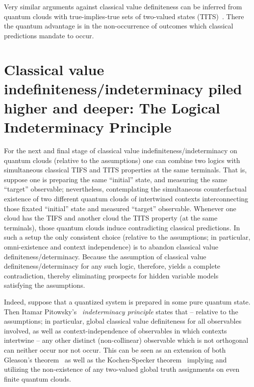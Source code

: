 \documentclass[%
  twocolumn,
 showpacs,
 showkeys,
 preprintnumbers,
 amsmath,amssymb,
 aps,
  pra,
  longbibliography,
 ]{revtex4-1}
\begin{document}
Very similar arguments against classical value definiteness can be inferred from quantum clouds with true-implies-true
sets of two-valued
states (TITS)~\citep{stairs83,clifton-93,Johansen-1994,Vermaas-1994,Belinfante-73,Pitowsky-1982-subs,Hardy-92,Hardy-93,hardy-97,Cabello-1995-ppks,cabello-96,cabello-97-nhvp,Badziag-2011,Cabello-2013-HP,Cabello-2013-Hardylike,2018-minimalYIYS}.
There the quantum advantage is in the non-occurrence of outcomes which classical predictions mandate to occur.


\section{Classical value indefiniteness/indeterminacy piled higher and deeper: The Logical Indeterminacy Principle}

For the next and final stage of classical value indefiniteness/indeterminacy on quantum clouds (relative to the assumptions)
one can combine two logics with simultaneous classical TIFS and TITS properties at the same terminals.
That is,
suppose one is preparing the same ``initial'' state, and measuring the same ``target'' observable;
nevertheless, contemplating
the simultaneous counterfactual existence of
two different quantum clouds of intertwined contexts
interconnecting those fixated ``initial'' state and measured ``target'' observable.
Whenever one cloud has the
TIFS and another cloud the TITS property (at the same terminals),
those quantum clouds induce contradicting classical predictions.
In such a setup the only consistent choice (relative to the assumptions; in particular, omni-existence and context independence)
is to abandon classical value definiteness/determinacy.
Because the assumption of classical value definiteness/determinacy for any such logic,
therefore, yields a complete contradiction,
thereby eliminating prospects for hidden
variable models~\citep{2012-incomput-proofsCJ,2015-AnalyticKS,svozil-2020-c}
satisfying the assumptions.

Indeed,
suppose that a quantized system is prepared in some pure quantum state.
Then
Itamar Pitowsky's~\citep{pitowsky:218,hru-pit-2003} {\em indeterminacy principle}
states that -- relative to the assumptions;
in particular, global classical value definiteness for all observables involved, as well as context-independence of observables in which contexts intertwine --
any other distinct (non-collinear) observable which is not orthogonal can neither occur nor not occur.
This can be seen as an extension of both Gleason's theorem~\citep{Gleason,ZirlSchl-65} as well as the Kochen-Specker theorem~\citep{kochen1}
implying and utilizing the non-existence of any two-valued global truth assignments on even finite quantum clouds.
\end{document}
